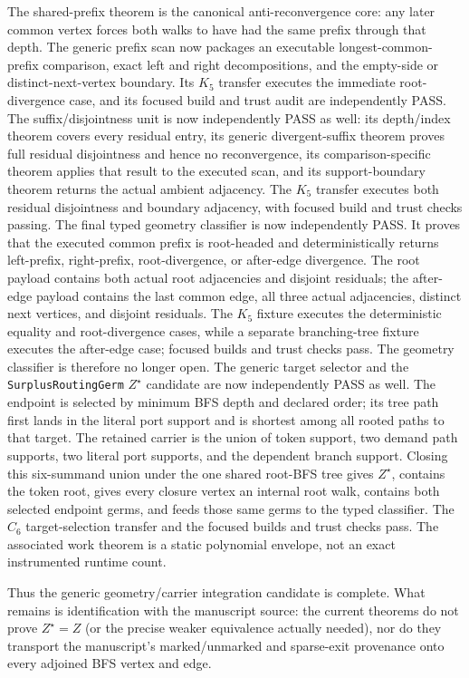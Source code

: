 \documentclass[11pt]{article}
\begin{document}
The shared-prefix theorem is the canonical anti-reconvergence core: any later
common vertex forces both walks to have had the same prefix through that
depth.  The generic prefix scan now packages an executable longest-common-prefix
comparison, exact left and right decompositions, and the empty-side or
distinct-next-vertex boundary.  Its $K_5$ transfer executes the immediate
root-divergence case, and its focused build and trust audit are independently
PASS.  The suffix/disjointness unit is now independently PASS as well: its
depth/index theorem covers every residual entry, its generic divergent-suffix
theorem proves full residual disjointness and hence no reconvergence, its
comparison-specific theorem applies that result to the executed scan, and its
support-boundary theorem returns the actual ambient adjacency.  The $K_5$
transfer executes both residual disjointness and boundary adjacency, with
focused build and trust checks passing.  The final typed geometry classifier
is now independently PASS.  It proves that the executed common prefix is
root-headed and deterministically returns left-prefix, right-prefix,
root-divergence, or after-edge divergence.  The root payload contains both
actual root adjacencies and disjoint residuals; the after-edge payload contains
the last common edge, all three actual adjacencies, distinct next vertices,
and disjoint residuals.  The $K_5$ fixture executes the deterministic equality
and root-divergence cases, while a separate branching-tree fixture executes
the after-edge case; focused builds and trust checks pass.  The geometry
classifier is therefore no longer open.  The generic target selector and the
\texttt{SurplusRoutingGerm} $Z^\star$ candidate are now independently PASS as
well.  The endpoint is selected by minimum BFS depth and declared order; its
tree path first lands in the literal port support and is shortest among all
rooted paths to that target.  The retained carrier is the union of token
support, two demand path supports, two literal port supports, and the dependent
branch support.  Closing this six-summand union under the one shared root-BFS
tree gives $Z^\star$, contains the token root, gives every closure vertex an
internal root walk, contains both selected endpoint germs, and feeds those
same germs to the typed classifier.  The $C_6$ target-selection transfer and
the focused builds and trust checks pass.  The associated work theorem is a
static polynomial envelope, not an exact instrumented runtime count.

Thus the generic geometry/carrier integration candidate is complete.  What
remains is identification with the manuscript source: the current theorems do
not prove $Z^\star=Z$ (or the precise weaker equivalence actually needed), nor
do they transport the manuscript's marked/unmarked and sparse-exit provenance
onto every adjoined BFS vertex and edge.
\end{document}
